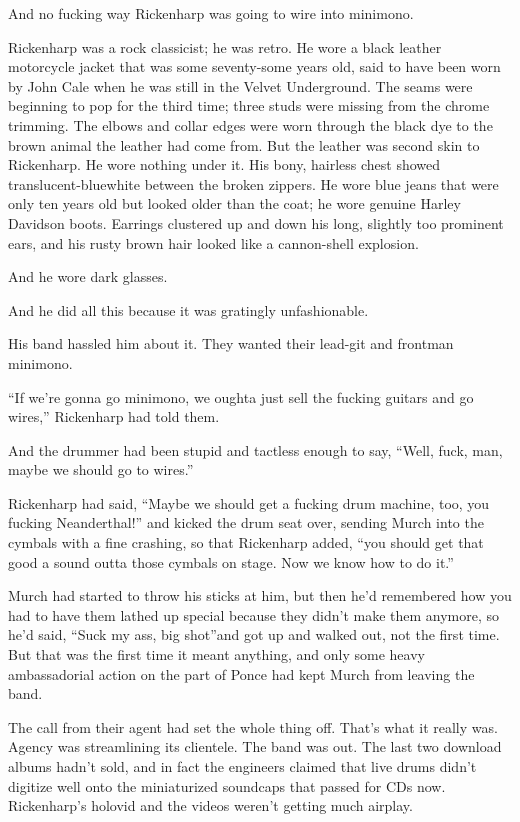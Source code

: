 And no fucking way Rickenharp was going to wire into minimono.

Rickenharp was a rock classicist; he was retro. He wore a black leather motorcycle jacket that was some seventy-some years old, said to have been worn by John Cale when he was still in the Velvet Underground. The seams were beginning to pop for the third time; three studs were missing from the chrome trimming. The elbows and collar edges were worn through the black dye to the brown animal the leather had come from. But the leather was second skin to Rickenharp. He wore nothing under it. His bony, hairless chest showed translucent-bluewhite between the broken zippers. He wore blue jeans that were only ten years old but looked older than the coat; he wore genuine Harley Davidson boots. Earrings clustered up and down his long, slightly too prominent ears, and his rusty brown hair looked like a cannon-shell explosion.

And he wore dark glasses.

And he did all this because it was gratingly unfashionable.

His band hassled him about it. They wanted their lead-git and frontman minimono.

“If we’re gonna go minimono, we oughta just sell the fucking guitars and go wires,” Rickenharp had told them.

And the drummer had been stupid and tactless enough to say, “Well, fuck, man, maybe we should go to wires.”

Rickenharp had said, “Maybe we should get a fucking drum machine, too, you fucking Neanderthal!” and kicked the drum seat over, sending Murch into the cymbals with a fine crashing, so that Rickenharp added, “you should get that good a sound outta those cymbals on stage. Now we know how to do it.”

Murch had started to throw his sticks at him, but then he’d remembered how you had to have them lathed up special because they didn’t make them anymore, so he’d said, “Suck my ass, big shot”and got up and walked out, not the first time. But that was the first time it meant anything, and only some heavy ambassadorial action on the part of Ponce had kept Murch from leaving the band.

The call from their agent had set the whole thing off. That’s what it really was. Agency was streamlining its clientele. The band was out. The last two download albums hadn’t sold, and in fact the engineers claimed that live drums didn’t digitize well onto the miniaturized soundcaps that passed for CDs now. Rickenharp’s holovid and the videos weren’t getting much airplay.

